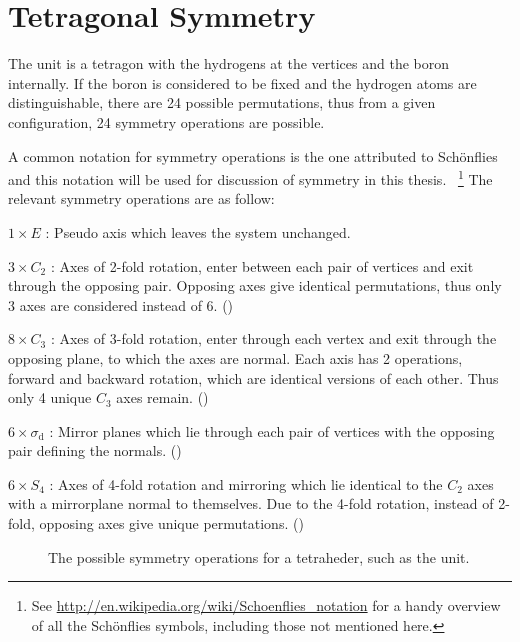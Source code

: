 \section{Tetragonal Symmetry}
\label{sec:symmetry}

The  unit is a tetragon with the hydrogens at the vertices and the boron internally.
If the boron is considered to be fixed and the hydrogen atoms are distinguishable, there are 24 possible permutations, thus from a given configuration, 24 symmetry operations are possible.

A common notation for symmetry operations is the one attributed to Sch\"onflies~\cite{schonflies-notation-1889} and this notation will be used for discussion of symmetry in this thesis.
~\footnote{See \url{http://en.wikipedia.org/wiki/Schoenflies_notation} for a handy overview of all the Sch\"onflies symbols, including those not mentioned here.}
The relevant symmetry operations are as follow:
\bit
\item $1 \times E$ : Pseudo axis which leaves the system unchanged.
\item $3 \times C_2$ : Axes of 2-fold rotation, enter between each pair of vertices and exit through the opposing pair.
Opposing axes give identical permutations, thus only 3 axes are considered instead of 6.
()
\item $8 \times C_3$ : Axes of 3-fold rotation, enter through each vertex and exit through the opposing plane, to which the axes are normal. Each axis has 2 operations, forward and backward rotation, which are identical versions of each other.
Thus only 4 unique $C_3$ axes remain.
()
\item $6 \times \sigma_\text{d}$ : Mirror planes which lie through each pair of vertices with the opposing pair defining the normals.
()
\item $6 \times S_4$ : Axes of 4-fold rotation and mirroring which lie identical to the $C_2$ axes with a mirrorplane normal to themselves. Due to the 4-fold rotation, instead of 2-fold, opposing axes give unique permutations.
()
\eit

\begin{figure}[ph]
  \begin{center}
    \parbox{0.85\linewidth}{
      \caption{The possible symmetry operations for a tetraheder, such as the  unit.
      }
      \label{fig:symmetry}
    }
  \end{center}
\end{figure}

